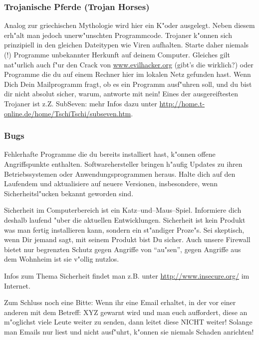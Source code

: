\subsubsection{Trojanische Pferde (Trojan Horses)} 
Analog zur griechischen Mythologie wird
hier ein K"oder ausgelegt. Neben diesem erh"alt man jedoch unerw"unschten
Programmcode. Trojaner k"onnen sich prinzipiell in den gleichen Dateitypen
wie Viren aufhalten. Starte daher niemals (!) Programme unbekannter Herkunft 
auf deinem Computer. Gleiches gilt nat"urlich auch f"ur den Crack von
\url{www.evilhacker.org} (gibt's die wirklich?) oder Programme die du auf einem
Rechner hier im lokalen Netz gefunden hast. Wenn Dich Dein Mailprogramm fragt,
ob es ein Programm ausf"uhren soll, und du bist dir nicht absolut sicher, warum,
antworte mit nein! Eines der ausgereiftesten Trojaner ist z.Z. SubSeven: mehr
Infos dazu unter \url{http://home.t-online.de/home/TschiTschi/subseven.htm}.

\subsubsection{Bugs}
Fehlerhafte Programme die du bereits installiert hast, k"onnen offene
Angriffspunkte enthalten. Softwarehersteller 
bringen h"aufig Updates zu ihren Betriebssystemen oder Anwendungsprogrammen heraus. 
Halte dich auf den Laufendem und aktualisiere auf neuere Versionen, insbesondere, 
wenn Sicherheitsl"ucken bekannt geworden sind.  

Sicherheit im Computerbereich ist ein Katz--und--Maus--Spiel. Informiere dich
deshalb laufend "uber die aktuellen Entwicklungen. Sicherheit ist kein Produkt
was man fertig installieren kann, sondern ein st"andiger Proze"s. Sei skeptisch,
wenn Dir jemand sagt, mit seinem Produkt bist Du sicher. Auch unsere Firewall
bietet nur begrenzten Schutz gegen Angriffe von "`au"sen"', gegen Angriffe aus 
dem Wohnheim ist sie v"ollig nutzlos.  

Infos zum Thema Sicherheit findet man z.B. unter \url{http://www.insecure.org/} im Internet.

Zum Schluss noch eine Bitte: Wenn ihr eine Email erhaltet, in der vor einer
anderen mit dem Betreff: XYZ gewarnt wird und man euch auffordert, diese an 
m"oglichst viele Leute weiter zu senden, dann leitet diese NICHT weiter! 
Solange man Emails nur liest und nicht ausf"uhrt, k"onnen sie niemals Schaden
anrichten!

